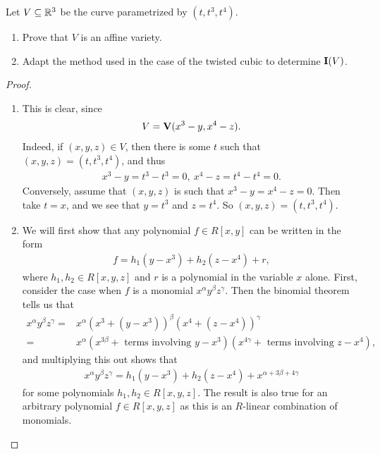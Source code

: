 \begin{exercise}{11}
Let $V\subseteq \mathbb{R}^3$ be the curve parametrized by $(t,t^3, t^4)$.
\begin{enumerate}
    \item Prove that $V$ is an affine variety.
    \item Adapt the method used in the case of the twisted cubic to determine $\mathbf{I}(V)$.
\end{enumerate}
\end{exercise}
\begin{proof}
    \begin{enumerate}
        \item This is clear, since 
        \begin{align*}
            V = \mathbf{V}(x^3 - y, x^4 - z).
        \end{align*}
        Indeed, if $(x,y,z)\in V$, then there is some $t$ such that $(x,y,z) = (t,t^3,t^4)$, and thus
        \begin{align*}
            x^3 - y = t^3 - t^3 = 0,~x^4 - z = t^4 - t^4 = 0.
        \end{align*}
        Conversely, assume that $(x,y,z)$ is such that $x^3 - y = x^4 - z = 0$. 
        Then take $t = x$, and we see that $y = t^3$ and $z= t^4$. So $(x,y,z) = (t,t^3, t^4)$.
        \item We will first show that any polynomial $f\in R[x,y]$ can be written in the form
        \begin{align*}
            f = h_1(y - x^3) + h_2(z-x^4)+ r,
        \end{align*}
        where $h_1,h_2\in R[x,y,z]$ and $r$ is a polynomial in the variable $x$ alone. 
        First, consider the case when $f$ is a monomial $x^\alpha y^\beta z^\gamma$. 
        Then the binomial theorem tells us that
        \begin{align*}
            x^\alpha y^\beta z^\gamma
            =& x^\alpha (x^3 + (y-x^3))^\beta (x^4 + (z-x^4))^\gamma\\
            =& x^\alpha (x^{3\beta} + \text{ terms involving }y-x^3)(x^{4\gamma} + \text{ terms involving } z-x^4),
        \end{align*}
        and multiplying this out shows that
        \begin{align*}
            x^\alpha y^\beta z^\gamma 
            = h_1(y-x^3) + h_2(z-x^4) + x^{\alpha + 3\beta + 4\gamma}
        \end{align*}
        for some polynomials $h_1,h_2\in R[x,y,z]$. 
        The result is also true for an arbitrary polynomial $f\in R[x,y,z]$ as this is an $R$-linear combination of monomials.
        

\end{enumerate}
\end{proof}
